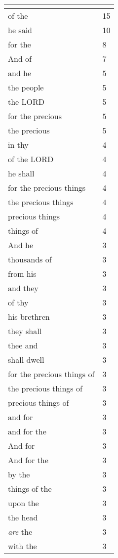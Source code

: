 \begin{center}
\begin{longtable}{|p{3.0in}|p{0.5in}|}
\hline \multicolumn{2}{c}{{ }} \\ \hline
\endfoot 
of the & 15\\ \hline 
he said & 10\\ \hline 
for the & 8\\ \hline 
And of & 7\\ \hline 
and he & 5\\ \hline 
the people & 5\\ \hline 
the LORD & 5\\ \hline 
for the precious & 5\\ \hline 
the precious & 5\\ \hline 
in thy & 4\\ \hline 
of the LORD & 4\\ \hline 
he shall & 4\\ \hline 
for the precious things & 4\\ \hline 
the precious things & 4\\ \hline 
precious things & 4\\ \hline 
things of & 4\\ \hline 
And he & 3\\ \hline 
thousands of & 3\\ \hline 
from his & 3\\ \hline 
and they & 3\\ \hline 
of thy & 3\\ \hline 
his brethren & 3\\ \hline 
they shall & 3\\ \hline 
thee and & 3\\ \hline 
shall dwell & 3\\ \hline 
for the precious things of & 3\\ \hline 
the precious things of & 3\\ \hline 
precious things of & 3\\ \hline 
and for & 3\\ \hline 
and for the & 3\\ \hline 
And for & 3\\ \hline 
And for the & 3\\ \hline 
by the & 3\\ \hline 
things of the & 3\\ \hline 
upon the & 3\\ \hline 
the head & 3\\ \hline 
\emph{are} the & 3\\ \hline 
with the & 3\\ \hline 
\end{longtable}
\end{center}





